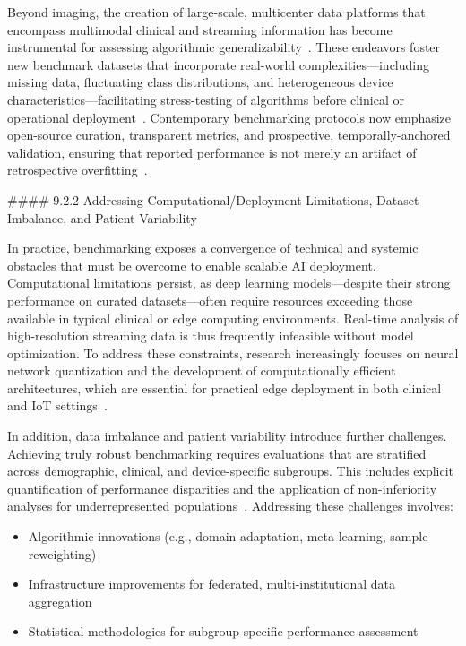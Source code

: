 \documentclass[11pt]{article}
\begin{document}
Beyond imaging, the creation of large-scale, multicenter data platforms that encompass multimodal clinical and streaming information has become instrumental for assessing algorithmic generalizability~\cite{ref34,ref35,ref37,ref45,ref48,ref65,ref83}. These endeavors foster new benchmark datasets that incorporate real-world complexities—including missing data, fluctuating class distributions, and heterogeneous device characteristics—facilitating stress-testing of algorithms before clinical or operational deployment~\cite{ref83}. Contemporary benchmarking protocols now emphasize open-source curation, transparent metrics, and prospective, temporally-anchored validation, ensuring that reported performance is not merely an artifact of retrospective overfitting~\cite{ref31,ref44,ref54}.

#### 9.2.2 Addressing Computational/Deployment Limitations, Dataset Imbalance, and Patient Variability

In practice, benchmarking exposes a convergence of technical and systemic obstacles that must be overcome to enable scalable AI deployment. Computational limitations persist, as deep learning models—despite their strong performance on curated datasets—often require resources exceeding those available in typical clinical or edge computing environments. Real-time analysis of high-resolution streaming data is thus frequently infeasible without model optimization. To address these constraints, research increasingly focuses on neural network quantization and the development of computationally efficient architectures, which are essential for practical edge deployment in both clinical and IoT settings~\cite{ref98,ref102,ref103,ref106}.
 
In addition, data imbalance and patient variability introduce further challenges. Achieving truly robust benchmarking requires evaluations that are stratified across demographic, clinical, and device-specific subgroups. This includes explicit quantification of performance disparities and the application of non-inferiority analyses for underrepresented populations~\cite{ref89,ref106}. Addressing these challenges involves:

\begin{itemize}
    \item Algorithmic innovations (e.g., domain adaptation, meta-learning, sample reweighting)
    \item Infrastructure improvements for federated, multi-institutional data aggregation
    \item Statistical methodologies for subgroup-specific performance assessment~\cite{ref102,ref103}
\end{itemize}
\end{document}
